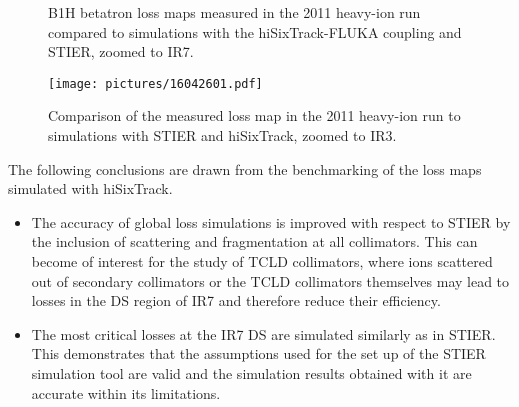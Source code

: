 \begin{figure}[t]
  \centering
  \small 
  \caption{B1H betatron loss maps measured in the 2011 heavy-ion run compared to simulations with the hiSixTrack-FLUKA coupling and STIER, zoomed to IR7.}  
  \label{pic:16070803}
  \end{figure}


\begin{figure}[t]  
    \centering
    \texttt{[image: pictures/16042601.pdf]}
    \caption{Comparison of the measured loss map in the 2011 heavy-ion run to simulations with STIER and hiSixTrack, zoomed to IR3.}  
    \label{pic:16042501}
\end{figure}

The following conclusions are drawn from the benchmarking of the loss maps simulated with hiSixTrack. 

\begin{itemize}
  \item The accuracy of global loss simulations is improved with respect to STIER by the inclusion of scattering and fragmentation at all collimators. This can become of interest for the study of TCLD collimators, where ions scattered out of secondary collimators or the TCLD collimators themselves may lead to losses in the DS region of IR7 and therefore reduce their efficiency. 
  \item The most critical losses at the IR7 DS are simulated similarly as in STIER. This demonstrates that the assumptions used for the set up of the STIER simulation tool are valid and the simulation results obtained with it are accurate within its limitations. 
\end{itemize}




